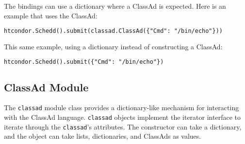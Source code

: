 The bindings can use a dictionary where a ClassAd is expected.
Here is an example that uses the ClassAd:
\footnotesize
\begin{verbatim}
htcondor.Schedd().submit(classad.ClassAd({"Cmd": "/bin/echo"}))
\end{verbatim}
\normalsize
This same example, using a dictionary instead of constructing a ClassAd:
\footnotesize
\begin{verbatim}
htcondor.Schedd().submit({"Cmd": "/bin/echo"})
\end{verbatim}
\normalsize


\subsection{\label{Python-ClassAd} ClassAd Module}

The \texttt{classad} module class provides a dictionary-like mechanism 
for interacting with the ClassAd language. 
\texttt{classad} objects implement the iterator interface to iterate 
through the \texttt{classad}'s attributes.
The constructor can take a dictionary,
and the object can take lists, dictionaries, and ClassAds as values.

